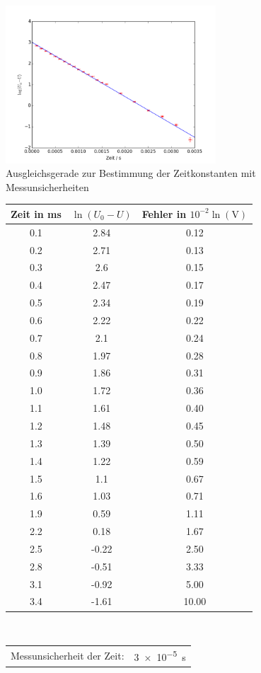 \begin{figure}[h!]
	\centering
	\includegraphics[width=0.7\textwidth]{Spannung2.png}
	\caption{Ausgleichsgerade zur Bestimmung der Zeitkonstanten mit Messunsicherheiten}
	\label{fig:Spannung2}
\end{figure} 
\begin{figure}[h!]
	\centering
	\begin{tabular}{c|c|c}
		Zeit in \si{\milli\second}& $\ln(U_0-U)$ & Fehler in $10^{-2}\ln(\si{\volt})$ \\
		\hline
		0.1 &  2.84 &  0.12 \\
		0.2 &  2.71 &  0.13 \\
		0.3 &  2.6  &  0.15 \\
		0.4 &  2.47 &  0.17 \\
		0.5 &  2.34 &  0.19 \\
		0.6 &  2.22 &  0.22 \\
		0.7 &  2.1  &  0.24 \\
		0.8 &  1.97 &  0.28 \\
		0.9 &  1.86 &  0.31 \\
		1.0 &  1.72 &  0.36 \\
		1.1 &  1.61 &  0.40  \\
		1.2 &  1.48 &  0.45 \\
		1.3 &  1.39 &  0.50  \\
		1.4 &  1.22 &  0.59 \\
		1.5 &  1.1  &  0.67 \\
		1.6 &  1.03 &  0.71 \\
		1.9 &  0.59 &  1.11 \\
		2.2 &  0.18 &  1.67 \\
		2.5 & -0.22 &  2.50  \\
		2.8 & -0.51 &  3.33 \\
		3.1 & -0.92 &  5.00   \\
		3.4 & -1.61 & 10.00    \\
	\end{tabular}
	\label{tab:aufladekurve}
	\\
	\vspace{1cm}
	\begin{tabular}{ll}
		Messunsicherheit der Zeit: & \SI{3e-5}{\second}
	\end{tabular}
\end{figure}



